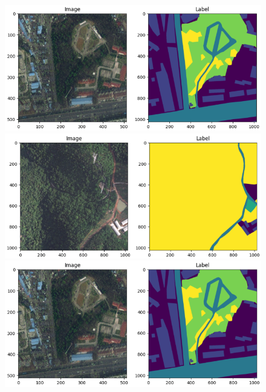 \documentclass{article}
\begin{document}
\begin{multicols}{2}
	
		\begin{figure}[H]
			\centering
			\begin{minipage}{0.8\linewidth}
				\centering
				\includegraphics[width=1\linewidth]{image/nst/urban+mask2.png}

				
			\end{minipage}
			\begin{minipage}{0.8\linewidth}
				\centering
				\includegraphics[width=1\linewidth]{image/nst/rural+mask2.png}
				
			\end{minipage}

			\begin{minipage}{0.8\linewidth}
				\centering
				\includegraphics[width=1\linewidth]{image/nst/mixed+mask2.png}


\end{minipage}
\end{figure}
\end{multicols}
\end{document}
